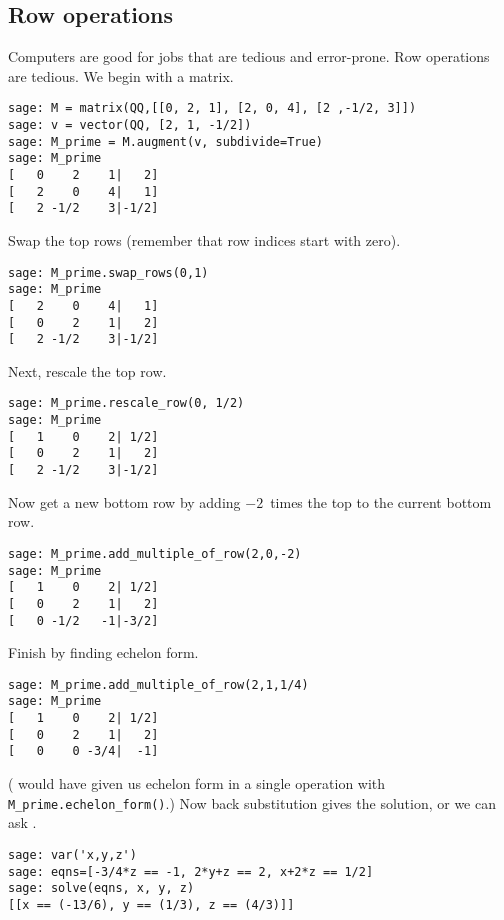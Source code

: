 \subsection{Row operations}
Computers are good for jobs that are tedious and error-prone.
Row operations are tedious.
We begin with a matrix.
\begin{lstlisting}[style=python]
sage: M = matrix(QQ,[[0, 2, 1], [2, 0, 4], [2 ,-1/2, 3]])
sage: v = vector(QQ, [2, 1, -1/2])                        
sage: M_prime = M.augment(v, subdivide=True)              
sage: M_prime                                             
[   0    2    1|   2]
[   2    0    4|   1]
[   2 -1/2    3|-1/2]
\end{lstlisting}
Swap the top rows (remember that row indices start with zero).
\begin{lstlisting}[style=python]
sage: M_prime.swap_rows(0,1)
sage: M_prime
[   2    0    4|   1]
[   0    2    1|   2]
[   2 -1/2    3|-1/2]
\end{lstlisting}
Next, rescale the top row.
\begin{lstlisting}[style=python]
sage: M_prime.rescale_row(0, 1/2)
sage: M_prime
[   1    0    2| 1/2]
[   0    2    1|   2]
[   2 -1/2    3|-1/2]  
\end{lstlisting}
Now get a new  bottom row by adding $-2$~times the top to the current bottom
row.
\begin{lstlisting}[style=python]
sage: M_prime.add_multiple_of_row(2,0,-2)
sage: M_prime
[   1    0    2| 1/2]
[   0    2    1|   2]
[   0 -1/2   -1|-3/2]  
\end{lstlisting}
Finish by finding echelon form.
\begin{lstlisting}[style=python]
sage: M_prime.add_multiple_of_row(2,1,1/4)
sage: M_prime                             
[   1    0    2| 1/2]
[   0    2    1|   2]
[   0    0 -3/4|  -1]  
\end{lstlisting}
(\Sage{} would have given us echelon form in a single operation with
\lstinline[style=inline]!M_prime.echelon_form()!.)
Now back substitution gives the solution, or we can ask \Sage.
\begin{lstlisting}[style=python]
sage: var('x,y,z')
sage: eqns=[-3/4*z == -1, 2*y+z == 2, x+2*z == 1/2]
sage: solve(eqns, x, y, z)
[[x == (-13/6), y == (1/3), z == (4/3)]]
\end{lstlisting}

